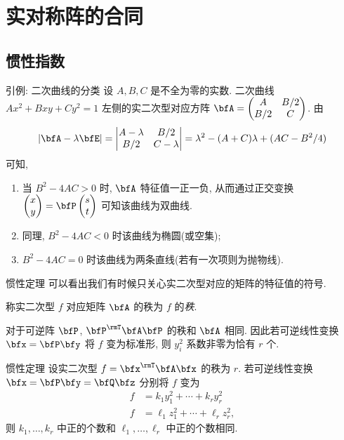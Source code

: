 \section{实对称阵的合同}

\subsection{惯性指数}

\begin{frame}{引例: 二次曲线的分类}
	\onslide<+->
	设 $A,B,C$ 是不全为零的实数.
	二次曲线 $Ax^2+Bxy+Cy^2=1$ 左侧的实二次型对应方阵 $\bfA=\begin{pmatrix}
		A&B/2\\
		B/2&C
	\end{pmatrix}$.
	\onslide<+->
	由
	\[|\bfA-\lambda\bfE|=\begin{vmatrix}
		A-\lambda&B/2\\
		B/2&C-\lambda
	\end{vmatrix}=\lambda^2-(A+C)\lambda+(AC-B^2/4)\]
	可知,
	\begin{enumerate}
		\item 当 $B^2-4AC>0$ 时, $\bfA$ 特征值一正一负, 
		\onslide<+->
		从而通过正交变换 $\begin{pmatrix}
			x\\y
		\end{pmatrix}=\bfP\begin{pmatrix}
			s\\t
		\end{pmatrix}$ 可知该曲线为双曲线.
		\item 同理, $B^2-4AC<0$ 时该曲线为椭圆(或空集);
		\item $B^2-4AC=0$ 时该曲线为两条直线(若有一次项则为抛物线).
	\end{enumerate}
\end{frame}


\begin{frame}{惯性定理}
	\onslide<+->
	可以看出我们有时候只关心实二次型对应的矩阵的特征值的符号.
	\onslide<+->
	\begin{definition}
		称实二次型 $f$ 对应矩阵 $\bfA$ 的秩为 $f$ 的\emph{秩}.
	\end{definition}
	\onslide<+->
	对于可逆阵 $\bfP$, $\bfP^\rmT\bfA\bfP$ 的秩和 $\bfA$ 相同.
	\onslide<+->
	因此若可逆线性变换 $\bfx=\bfP\bfy$ 将 $f$ 变为标准形, 则 $y_i^2$ 系数非零为恰有 $r$ 个.
	\onslide<+->
	\begin{algorithm}{惯性定理}
		设实二次型 $f=\bfx^\rmT\bfA\bfx$ 的秩为 $r$.
		若可逆线性变换 $\bfx=\bfP\bfy=\bfQ\bfz$ 分别将 $f$ 变为
		\begin{align*}
			f&=k_1y_1^2+\cdots+k_ry_r^2\\
			f&=\ell_1z_1^2+\cdots+\ell_rz_r^2,
		\end{align*}
		则 $k_1,\dots,k_r$ 中正的个数和 $\ell_1,\dots,\ell_r$ 中正的个数相同.
	\end{algorithm}
\end{frame}


